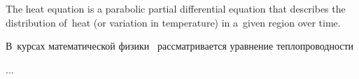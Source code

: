 \begin{otherlanguage}{russian}

{\small
The heat equation is a parabolic partial differential equation that describes the distribution of~heat (or variation in temperature) in a~given region over time.
\par}

В~курсах математической физики~\cite{tihonovsamarsky-mathphysicsequations} рассматривается уравнение теплопроводности

...



\end{otherlanguage}



